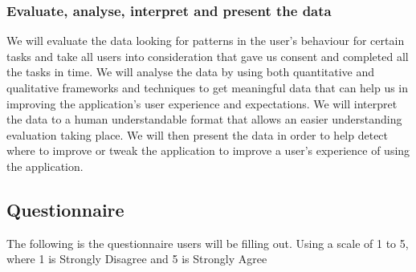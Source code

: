 \documentclass[12pt]{article}
\begin{document}
\subsubsection{Evaluate, analyse, interpret and present the data} 

We will evaluate the data looking for patterns in the user’s behaviour for certain tasks and take all users into consideration that gave us consent and completed all the tasks in time. We will analyse the data by using both quantitative and qualitative frameworks and techniques to get meaningful data that can help us in improving the application’s user experience and expectations. We will interpret the data to a human understandable format that allows an easier understanding evaluation taking place. We will then present the data in order to help detect where to improve or tweak the application to improve a user’s experience of using the application. 

\newpage
\subsection{Questionnaire}
The following is the questionnaire users will be filling out.
Using a scale of 1 to 5, where 1 is Strongly Disagree and 5 is Strongly Agree
\end{document}
